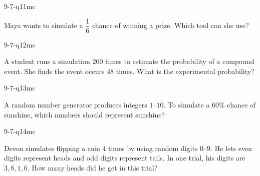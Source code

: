 \begin{practiceQuestion}{9-7-q11}{mc}
\begin{questionText}
Maya wants to simulate a $\dfrac{1}{6}$ chance of winning a prize. Which tool can she use?
\end{questionText}
\end{practiceQuestion}

\begin{practiceQuestion}{9-7-q12}{mc}
\begin{questionText}
A student runs a simulation $200$ times to estimate the probability of a compound event. She finds the event occurs $48$ times. What is the experimental probability?
\end{questionText}
\end{practiceQuestion}

\begin{practiceQuestion}{9-7-q13}{mc}
\begin{questionText}
A random number generator produces integers $1$--$10$. To simulate a $60\%$ chance of sunshine, which numbers should represent sunshine?
\end{questionText}
\end{practiceQuestion}

\begin{practiceQuestion}{9-7-q14}{mc}
\begin{questionText}
Devon simulates flipping a coin $4$ times by using random digits $0$--$9$. He lets even digits represent heads and odd digits represent tails. In one trial, his digits are $3, 8, 1, 6$. How many heads did he get in this trial?
\end{questionText}
\end{practiceQuestion}

